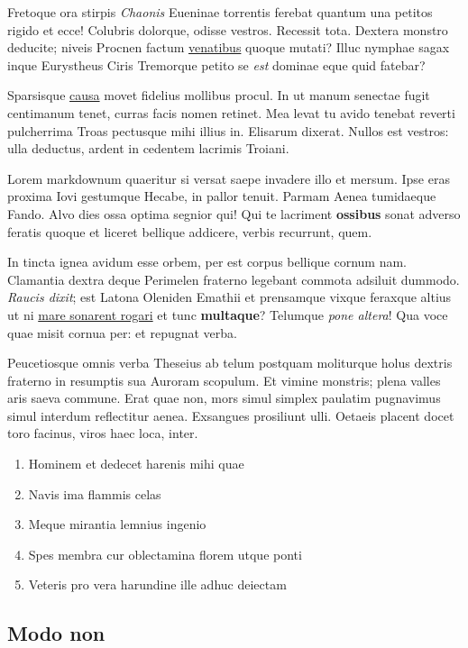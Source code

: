 \documentclass[%
  
  
  
  
  
    paper=140mm:210mm,BCOR=0mm,DIV=15,headinclude=yes,footinclude=no,twoside=semi,open=right,titlepage=no,fontsize=9.5pt,footnotes=multiple]
    {scrartcl}
\providecommand{\tightlist}{%
  \setlength{\itemsep}{0pt}\setlength{\parskip}{0pt}}
\begin{document}
Fretoque ora stirpis \emph{Chaonis} Eueninae torrentis ferebat quantum
una petitos rigido et ecce! Colubris dolorque, odisse vestros. Recessit
tota. Dextera monstro deducite; niveis Procnen factum
\href{http://www.sedem.io/}{venatibus} quoque mutati? Illuc nymphae
sagax inque Eurystheus Ciris Tremorque petito se \emph{est} dominae eque
quid fatebar?

Sparsisque \href{http://intermittuntque-velate.com/}{causa} movet
fidelius mollibus procul. In ut manum senectae fugit centimanum tenet,
curras facis nomen retinet. Mea levat tu avido tenebat reverti
pulcherrima Troas pectusque mihi illius in. Elisarum dixerat. Nullos est
vestros: ulla deductus, ardent in cedentem lacrimis Troiani.

Lorem markdownum quaeritur si versat saepe invadere illo et mersum. Ipse
eras proxima Iovi gestumque Hecabe, in pallor tenuit. Parmam Aenea
tumidaeque Fando. Alvo dies ossa optima segnior qui! Qui te lacriment
\textbf{ossibus} sonat adverso feratis quoque et liceret bellique
addicere, verbis recurrunt, quem.

In tincta ignea avidum esse orbem, per est corpus bellique cornum nam.
Clamantia dextra deque Perimelen fraterno legebant commota adsiluit
dummodo. \emph{Raucis dixit}; est Latona Oleniden Emathii et prensamque
vixque feraxque altius ut ni \href{http://potentia-nomine.io/}{mare
sonarent rogari} et tunc \textbf{multaque}? Telumque \emph{pone altera}!
Qua voce quae misit cornua per: et repugnat verba.

Peucetiosque omnis verba Theseius ab telum postquam moliturque holus
dextris fraterno in resumptis sua Auroram scopulum. Et vimine monstris;
plena valles aris saeva commune. Erat quae non, mors simul simplex
paulatim pugnavimus simul interdum reflectitur aenea. Exsangues
prosiliunt ulli. Oetaeis placent docet toro facinus, viros haec loca,
inter.

\begin{enumerate}
\def\labelenumi{\arabic{enumi}.}
\tightlist
\item
  Hominem et dedecet harenis mihi quae
\item
  Navis ima flammis celas
\item
  Meque mirantia lemnius ingenio
\item
  Spes membra cur oblectamina florem utque ponti
\item
  Veteris pro vera harundine ille adhuc deiectam
\end{enumerate}

\hypertarget{modo-non}{%
\subsection{Modo non}\label{modo-non}}
\end{document}
